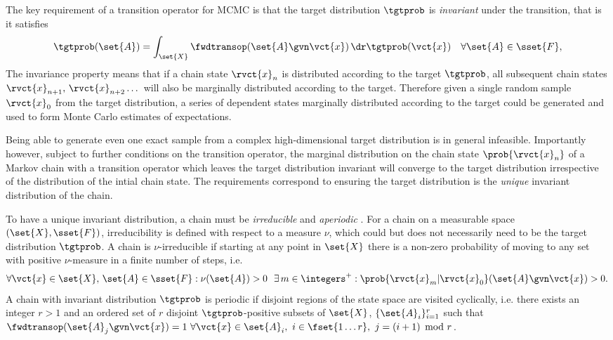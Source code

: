 The key requirement of a transition operator for \ac{MCMC} is that the target distribution $\tgtprob$ is \emph{invariant} under the transition, that is it satisfies
\begin{equation}
  \label{eq:invariant-distribution}
  \tgtprob(\set{A}) = \int_{\set{X}} \fwdtransop(\set{A} \gvn \vct{x}) \,\dr\tgtprob(\vct{x})
  \quad\forall \set{A} \in \sset{F},  
\end{equation}
The invariance property means that if a chain state $\rvct{x}_n$ is distributed according to the target $\tgtprob$, all subsequent chain states $\rvct{x}_{n+1},\,\rvct{x}_{n+2}\dots$ will also be marginally distributed according to the target. Therefore given a single random sample $\rvct{x}_{0}$ from the target distribution, a series of dependent states marginally distributed according to the target could be generated and used to form Monte Carlo estimates of expectations.

Being able to generate even one exact sample from a complex high-dimensional target distribution is in general infeasible. Importantly however, subject to further conditions on the transition operator, the marginal distribution on the chain state $\prob{\rvct{x}_n}$ of a Markov chain with a transition operator which leaves the target distribution invariant will converge to the target distribution irrespective of the distribution of the intial chain state. The requirements correspond to ensuring the target distribution is the \emph{unique} invariant distribution of the chain.%

To have a unique invariant distribution, a chain must be \emph{irreducible} and \emph{aperiodic} \citep{tierney1994markov}. For a chain on a measurable space $(\set{X},\sset{F})$, irreducibility is defined with respect to a measure $\nu$, which could but does not necessarily need to be the target distribution $\tgtprob$. A chain is $\nu$-irreducible if starting at any point in $\set{X}$ there is a non-zero probability of moving to any set with positive $\nu$-measure in a finite number of steps, i.e.
\begin{equation}\label{eq:irreducibility-criteria}
\begin{split}
  \forall \vct{x} \in \set{X},\, \set{A} \in \sset{F} : \nu(\set{A}) > 0
  ~~\exists\, m \in \integers^+ :
  \prob{\rvct{x}_m|\rvct{x}_0}(\set{A} \gvn \vct{x}) > 0. 
\end{split}
\end{equation}  
A chain with invariant distribution $\tgtprob$ is periodic if disjoint regions of the state space are visited cyclically, i.e. there exists an integer $r > 1$ and an ordered set of $r$ disjoint $\tgtprob$-positive subsets of $\set{X}$, $\lbrace \set{A}_i \rbrace_{i=1}^r$ such that $\fwdtransop(\set{A}_{j} \gvn \vct{x}) = 1 ~\forall \vct{x} \in \set{A}_i,~ i \in \fset{1 \dots r}, ~j = (i + 1) \kern-2pt\mod r$.

